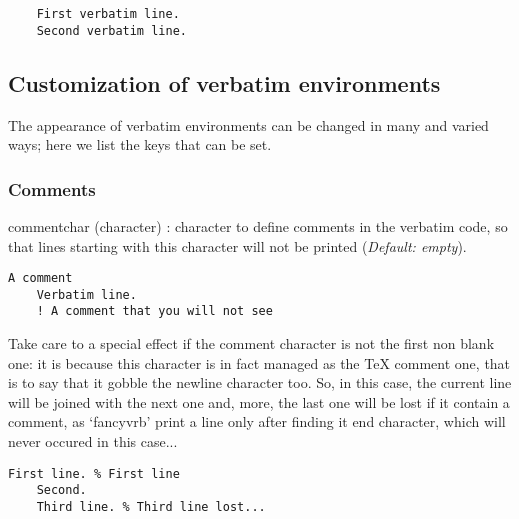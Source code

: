 \documentclass{article}
\newcommand\FVrbPackage{`\textsf{fancyvrb}'}
\providecommand\optname[1]{\textsf{#1}}
\newenvironment{optlist}{\begin{description}%
  \renewcommand\makelabel[1]{%
    \descriptionlabel{\mdseries\optname{##1}}}%
  \itemsep0.25\itemsep}%
 {\end{description}}
\begin{document}
\begin{SideBySideExample}
  \begin{Verbatim}
    First verbatim line.
    Second verbatim line.
  \end{Verbatim}
\end{SideBySideExample}

\subsection{Customization of verbatim environments}

  The appearance of verbatim environments can be changed in many and
varied ways; here we list the keys that can be set. 

\subsubsection{Comments}

\begin{optlist}
  \item[commentchar (character)]: character to define comments in the
  verbatim code, so that lines starting with this character will not be
  printed (\emph{Default: empty}).
\end{optlist}

\begin{SideBySideExample}
  \begin{Verbatim}[commentchar=!]
    A comment
    Verbatim line.
    ! A comment that you will not see
  \end{Verbatim}
\end{SideBySideExample}

  Take care to a special effect if the comment character is not the first
non blank one: it is because this character is in fact managed as the \TeX{}
comment one, that is to say that it gobble the newline character too. So, in
this case, the current line will be joined with the next one and, more, the
last one will be lost if it contain a comment, as \FVrbPackage{} print a
line only after finding it end character, which will never occured in this
case...

\begin{SideBySideExample}
  \begin{Verbatim}[commentchar=\%]
    First line. % First line
    Second.
    Third line. % Third line lost...
  \end{Verbatim}
\end{SideBySideExample}
\end{document}
